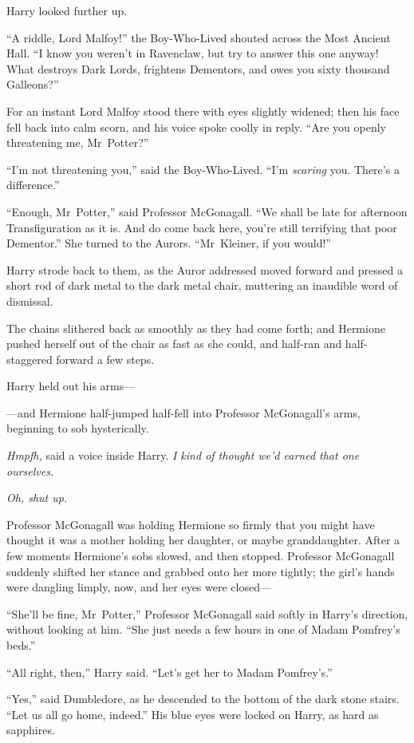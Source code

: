 Harry looked further up.

“A riddle, Lord Malfoy!” the Boy-Who-Lived shouted across the Most Ancient Hall. “I know you weren’t in Ravenclaw, but try to answer this one anyway! What destroys Dark Lords, frightens Dementors, and owes you sixty thousand Galleons?”

For an instant Lord Malfoy stood there with eyes slightly widened; then his face fell back into calm scorn, and his voice spoke coolly in reply. “Are you openly threatening me, Mr~Potter?”

“I’m not threatening you,” said the Boy-Who-Lived. “I’m \emph{scaring} you. There’s a difference.”

“Enough, Mr~Potter,” said Professor McGonagall. “We shall be late for afternoon Transfiguration as it is. And do come back here, you’re still terrifying that poor Dementor.” She turned to the Aurors. “Mr~Kleiner, if you would!”

Harry strode back to them, as the Auror addressed moved forward and pressed a short rod of dark metal to the dark metal chair, muttering an inaudible word of dismissal.

The chains slithered back as smoothly as they had come forth; and Hermione pushed herself out of the chair as fast as she could, and half-ran and half-staggered forward a few steps.

Harry held out his arms—

—and Hermione half-jumped half-fell into Professor McGonagall’s arms, beginning to sob hysterically.

\emph{Hmpfh,} said a voice inside Harry. \emph{I kind of thought we’d earned that one ourselves.}

\emph{Oh, shut up.}

Professor McGonagall was holding Hermione so firmly that you might have thought it was a mother holding her daughter, or maybe granddaughter. After a few moments Hermione’s sobs slowed, and then stopped. Professor McGonagall suddenly shifted her stance and grabbed onto her more tightly; the girl’s hands were dangling limply, now, and her eyes were closed—

“She’ll be fine, Mr~Potter,” Professor McGonagall said softly in Harry’s direction, without looking at him. “She just needs a few hours in one of Madam Pomfrey’s beds.”

“All right, then,” Harry said. “Let’s get her to Madam Pomfrey’s.”

“Yes,” said Dumbledore, as he descended to the bottom of the dark stone stairs. “Let us all go home, indeed.” His blue eyes were locked on Harry, as hard as sapphires.

